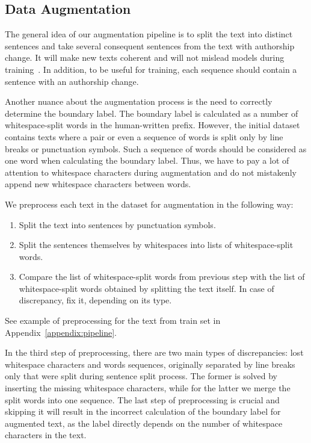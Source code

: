 \documentclass[11pt]{article}
\begin{document}
\subsection{Data Augmentation}
  \label{sec:augment}
   The general idea of our augmentation pipeline is to split the text into distinct sentences and take several consequent sentences from the text with authorship change. It will make new texts coherent and will not mislead models during training~\cite{ostyakova-etal-2023-chatgpt}. In addition, to be useful for training, each sequence should contain a sentence with an authorship change.

   
    Another nuance about the augmentation process is the need to correctly determine the boundary label. The boundary label is calculated as a number of whitespace-split words in the human-written prefix. However, the initial dataset contains texts where a pair or even a sequence of words is split only by line breaks or punctuation symbols. Such a sequence of words should be considered as one word when calculating the boundary label. Thus, we have to pay a lot of attention to whitespace characters during augmentation and do not mistakenly append new whitespace characters between words. 

    
    We preprocess each text in the dataset for augmentation in the following way: 
    \begin{enumerate}
        \item Split the text into sentences by punctuation symbols.
        \item Split the sentences themselves by whitespaces into lists of whitespace-split words.
        \item Compare the list of whitespace-split words from previous step with the list of whitespace-split words obtained by splitting the text itself. In case of discrepancy, fix it, depending on its type.
    \end{enumerate}
     See example of preprocessing for the text from train set in Appendix~\ref{appendix:pipeline}.
     
    In the third step of preprocessing, there are two main types of discrepancies: lost whitespace characters and words sequences, originally separated by line breaks only that were split during sentence split process. The former is solved by inserting the missing whitespace characters, while for the latter we merge the split words into one sequence.
    The last step of preprocessing is crucial and skipping it will result in the incorrect calculation of the boundary label for augmented text, as the label directly depends on the number of whitespace characters in the text. 
   
\end{document}
